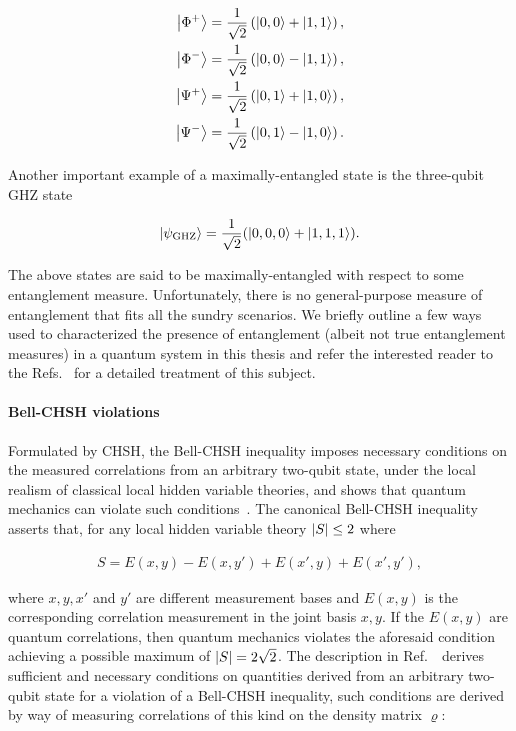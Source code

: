 \begin{align}
	\ket{\Phi^+}   &= \frac{1}{\sqrt{2}} \left(\ket{0,0} + \ket{1,1}\right), \nonumber \\
	\ket{\Phi^-}   &= \frac{1}{\sqrt{2}} \left(\ket{0,0} - \ket{1,1}\right),\nonumber \\
	\ket{\Psi^{+}} &= \frac{1}{\sqrt{2}} \left(\ket{0,1} + \ket{1,0}\right), \nonumber \\
	\ket{\Psi^{-}} &= \frac{1}{\sqrt{2}} \left(\ket{0,1} - \ket{1,0}\right).
\end{align}

\noindent
Another important example of a maximally-entangled state is the three-qubit \acs{GHZ} state

\begin{align}
	\ket{\psi_\text{GHZ}} = \frac{1}{\sqrt{2}}(\ket{0,0,0} + \ket{1,1,1}).
\end{align}

\noindent
The above states are said to be maximally-entangled with respect to some entanglement measure. Unfortunately, there is no general-purpose measure of entanglement that fits all the sundry scenarios. We briefly outline a few ways used to characterized the presence of entanglement (albeit not true entanglement measures) in a quantum system in this thesis and refer the interested reader to the Refs.~\cite{Plenio_2005,Horodecki_2009} for a detailed treatment of this subject.

\paragraph{Bell-CHSH violations}
\noindent
Formulated by \gls{CHSH}, the Bell-\acs{CHSH} inequality imposes necessary conditions on the measured correlations from an arbitrary two-qubit state, under the local realism of classical local hidden variable theories, and shows that quantum mechanics can violate such conditions~\cite{CHSH_1969}. The canonical Bell-\acs{CHSH} inequality asserts that, for any local hidden variable theory $\abs{S} \leq 2$ where 

\begin{align}
	S = E(x,y) - E(x,y') + E(x',y) + E(x',y'),
\end{align}

\noindent
where $x,y,x'$ and $y'$ are different measurement bases and $E(x,y)$ is the corresponding correlation measurement in the joint basis $x, y$. If the $E(x,y)$ are quantum correlations, then quantum mechanics violates the aforesaid condition achieving a possible maximum of $\abs{S} = 2 \sqrt{2}$. The description in Ref.~\cite{HORODECKI_1995}~\etal derives sufficient and necessary conditions on quantities derived from an arbitrary two-qubit state for a violation of a Bell-\acs{CHSH} inequality, such conditions are derived by way of measuring correlations of this kind on the density matrix $\varrho$:

